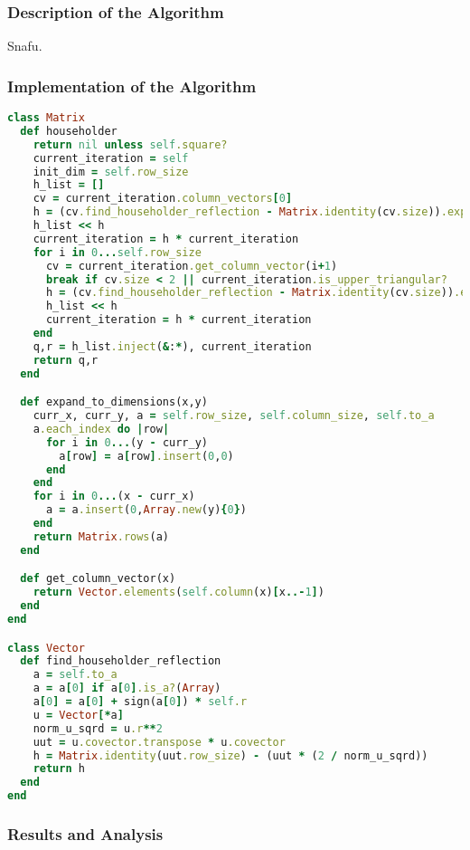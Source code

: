 \documentclass[letterpaper,12pt]{article}
\begin{document}
\subsubsection{Description of the Algorithm}

Snafu.

\subsubsection{Implementation of the Algorithm}

\lstset{caption=QR Decomposition via Householder Reflections}
\begin{lstlisting}[language=ruby]
class Matrix
  def householder
    return nil unless self.square?
    current_iteration = self
    init_dim = self.row_size
    h_list = []
    cv = current_iteration.column_vectors[0]
    h = (cv.find_householder_reflection - Matrix.identity(cv.size)).expand_to_dimensions(init_dim,init_dim) + Matrix.identity(init_dim)
    h_list << h
    current_iteration = h * current_iteration
    for i in 0...self.row_size
      cv = current_iteration.get_column_vector(i+1)
      break if cv.size < 2 || current_iteration.is_upper_triangular?
      h = (cv.find_householder_reflection - Matrix.identity(cv.size)).expand_to_dimensions(init_dim,init_dim) + Matrix.identity(init_dim)
      h_list << h
      current_iteration = h * current_iteration
    end
    q,r = h_list.inject(&:*), current_iteration
    return q,r
  end

  def expand_to_dimensions(x,y)
    curr_x, curr_y, a = self.row_size, self.column_size, self.to_a
    a.each_index do |row|
      for i in 0...(y - curr_y)
        a[row] = a[row].insert(0,0)
      end
    end
    for i in 0...(x - curr_x)
      a = a.insert(0,Array.new(y){0})
    end
    return Matrix.rows(a)
  end

  def get_column_vector(x)
    return Vector.elements(self.column(x)[x..-1])
  end
end

class Vector
  def find_householder_reflection
    a = self.to_a
    a = a[0] if a[0].is_a?(Array)
    a[0] = a[0] + sign(a[0]) * self.r
    u = Vector[*a]
    norm_u_sqrd = u.r**2
    uut = u.covector.transpose * u.covector
    h = Matrix.identity(uut.row_size) - (uut * (2 / norm_u_sqrd))
    return h
  end
end
\end{lstlisting}

\subsubsection{Results and Analysis}
\end{document}

